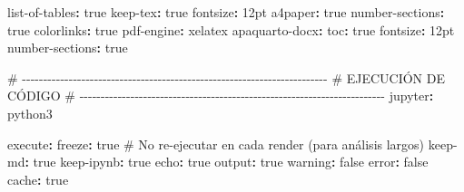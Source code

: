 \documentclass[
  doc,
  floatsintext,
  longtable,
  a4paper,
  nolmodern,
  notxfonts,
  notimes,
  12pt,
  colorlinks=true,linkcolor=blue,citecolor=blue,urlcolor=blue]{apa7}
\newenvironment{Shaded}{\begin{snugshade}}{\end{snugshade}}
\newcommand{\AttributeTok}[1]{\textcolor[rgb]{0.40,0.45,0.13}{#1}}
\newcommand{\CharTok}[1]{\textcolor[rgb]{0.13,0.47,0.30}{#1}}
\newcommand{\CommentTok}[1]{\textcolor[rgb]{0.37,0.37,0.37}{#1}}
\newcommand{\FunctionTok}[1]{\textcolor[rgb]{0.28,0.35,0.67}{#1}}
\newcommand{\KeywordTok}[1]{\textcolor[rgb]{0.00,0.23,0.31}{\textbf{#1}}}
\begin{document}
\begin{Shaded}
\begin{Highlighting}[]
\AttributeTok{    }\FunctionTok{list{-}of{-}tables}\KeywordTok{:}\AttributeTok{ }\CharTok{true}
\AttributeTok{    }\FunctionTok{keep{-}tex}\KeywordTok{:}\AttributeTok{ }\CharTok{true}
\AttributeTok{    }\FunctionTok{fontsize}\KeywordTok{:}\AttributeTok{ 12pt}
\AttributeTok{    }\FunctionTok{a4paper}\KeywordTok{:}\AttributeTok{ }\CharTok{true}
\AttributeTok{    }\FunctionTok{number{-}sections}\KeywordTok{:}\AttributeTok{ }\CharTok{true}
\AttributeTok{    }\FunctionTok{colorlinks}\KeywordTok{:}\AttributeTok{ }\CharTok{true}
\AttributeTok{    }\FunctionTok{pdf{-}engine}\KeywordTok{:}\AttributeTok{ xelatex}
\AttributeTok{    }
\AttributeTok{  }\FunctionTok{apaquarto{-}docx}\KeywordTok{:}
\AttributeTok{    }\FunctionTok{toc}\KeywordTok{:}\AttributeTok{ }\CharTok{true}
\AttributeTok{    }\FunctionTok{fontsize}\KeywordTok{:}\AttributeTok{ 12pt}
\AttributeTok{    }\FunctionTok{number{-}sections}\KeywordTok{:}\AttributeTok{ }\CharTok{true}

\CommentTok{\# {-}{-}{-}{-}{-}{-}{-}{-}{-}{-}{-}{-}{-}{-}{-}{-}{-}{-}{-}{-}{-}{-}{-}{-}{-}{-}{-}{-}{-}{-}{-}{-}{-}{-}{-}{-}{-}{-}{-}{-}{-}{-}{-}{-}{-}{-}{-}{-}{-}{-}{-}{-}{-}{-}{-}{-}{-}{-}{-}{-}{-}{-}{-}{-}{-}{-}{-}{-}{-}{-}{-}{-}}
\CommentTok{\# EJECUCIÓN DE CÓDIGO}
\CommentTok{\# {-}{-}{-}{-}{-}{-}{-}{-}{-}{-}{-}{-}{-}{-}{-}{-}{-}{-}{-}{-}{-}{-}{-}{-}{-}{-}{-}{-}{-}{-}{-}{-}{-}{-}{-}{-}{-}{-}{-}{-}{-}{-}{-}{-}{-}{-}{-}{-}{-}{-}{-}{-}{-}{-}{-}{-}{-}{-}{-}{-}{-}{-}{-}{-}{-}{-}{-}{-}{-}{-}{-}{-}}
\FunctionTok{jupyter}\KeywordTok{:}\AttributeTok{ python3}

\FunctionTok{execute}\KeywordTok{:}
\AttributeTok{  }\FunctionTok{freeze}\KeywordTok{:}\AttributeTok{ }\CharTok{true}\CommentTok{ \# No re{-}ejecutar en cada render (para análisis largos)}
\AttributeTok{  }\FunctionTok{keep{-}md}\KeywordTok{:}\AttributeTok{ }\CharTok{true}
\AttributeTok{  }\FunctionTok{keep{-}ipynb}\KeywordTok{:}\AttributeTok{ }\CharTok{true}
\AttributeTok{  }\FunctionTok{echo}\KeywordTok{:}\AttributeTok{ }\CharTok{true}
\AttributeTok{  }\FunctionTok{output}\KeywordTok{:}\AttributeTok{ }\CharTok{true}
\AttributeTok{  }\FunctionTok{warning}\KeywordTok{:}\AttributeTok{ }\CharTok{false}
\AttributeTok{  }\FunctionTok{error}\KeywordTok{:}\AttributeTok{ }\CharTok{false}
\AttributeTok{  }\FunctionTok{cache}\KeywordTok{:}\AttributeTok{ }\CharTok{true}


\end{Highlighting}
\end{Shaded}
\end{document}
